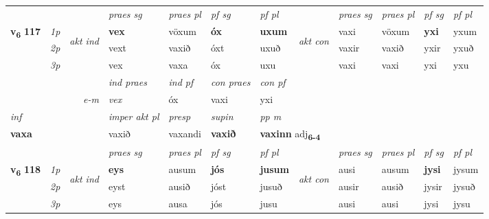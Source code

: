 \begin{longtable}[l]{X>{\footnotesize\itshape}llXXXXlXXXX}
\midrule

 & &   & \textit{praes sg}  & \textit{praes pl}    & \textit{ pf sg} & \textit{pf pl} & & \textit{praes sg}  & \textit{praes pl}    & \textit{pf sg} & \textit{pf pl }  \\ \cmidrule{4-7} \cmidrule{9-12}
 \multirow{2}{*}{{{\textbf{v{\textsubscript{6}}} \Large{\textbf{117}}}}}  & 1p & \multirow{3}{*}{\begin{turn}{90}\textit{akt ind}\end{turn}} & \textbf{vex} & vöxum & \textbf{óx} & \textbf{uxum} & \multirow{3}{*}{\begin{turn}{90}\textit{akt con}\end{turn}} &vaxi & vöxum & \textbf{yxi} & yxum\\*
 & 2p &  &  vext  & vaxið & óxt & uxuð & & vaxir & vaxið & yxir & yxuð \\*
 & 3p &  & vex & vaxa & óx & uxu & & vaxi & vaxi& yxi & yxu \\*
\cmidrule{4-7} \cmidrule{9-12}

   && &  \textit{ind praes} & \textit{ind pf} & \textit{con praes} & \textit{con pf} \\*
\multicolumn{3}{r}{\textit{e-m}} & vex & óx & vaxi & yxi \\*

\cmidrule{4-7}
   {\textit{inf}} & &  & \textit{imper akt pl}   & \textit{presp} & \textit{supin}  & \textit{pp m} \\*
  {\textbf{vaxa}} & &  & vaxið   & vaxandi &  \textbf{vaxið}  & \multicolumn{2}{l}{\textbf{vaxinn} adj\textbf{\textsubscript{6-4}}} \\*

\midrule

 & &   & \textit{praes sg}  & \textit{praes pl}    & \textit{ pf sg} & \textit{pf pl} & & \textit{praes sg}  & \textit{praes pl}    & \textit{pf sg} & \textit{pf pl }  \\ \cmidrule{4-7} \cmidrule{9-12}
 \multirow{2}{*}{{{\textbf{v{\textsubscript{6}}} \Large{\textbf{118}}}}}  & 1p & \multirow{3}{*}{\begin{turn}{90}\textit{akt ind}\end{turn}} & \textbf{eys} & ausum & \textbf{jós} & \textbf{jusum} & \multirow{3}{*}{\begin{turn}{90}\textit{akt con}\end{turn}} &ausi & ausum & \textbf{jysi} & jysum\\*
 & 2p &  &  eyst  & ausið & jóst & jusuð & & ausir & ausið & jysir & jysuð \\*
 & 3p &  & eys & ausa & jós & jusu & & ausi & ausi& jysi & jysu \\*
\cmidrule{4-7} \cmidrule{9-12}


\end{longtable}
